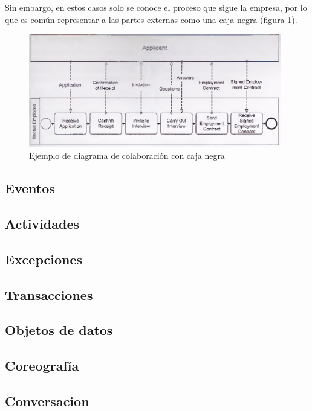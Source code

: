 Sin embargo, en estos casos solo se conoce el proceso que sigue la empresa, por lo que es común representar a las partes externas como una caja negra (figura \ref{fig:diagrama_colaboracion_caja_negra}).

\begin{figure}[!htb]
  \begin{center}
    \includegraphics[width=11cm]{./imagenes/diagrama_colaboracion_caja_negra.png}
    \caption{Ejemplo de diagrama de colaboración con caja negra}
    \label{fig:diagrama_colaboracion_caja_negra}
  \end{center}
\end{figure}

\subsection{Eventos}

\subsection{Actividades}

\subsection{Excepciones}

\subsection{Transacciones}

\subsection{Objetos de datos}

\subsection{Coreografía}

\subsection{Conversacion}
